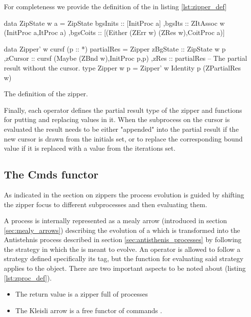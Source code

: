 For completeness we provide the definition of the  in
listing \ref{lst:zipper_def}

\begin{code}
\begin{haskellcode}
 data ZipState w a =
  ZipState
  { bgsInits :: [InitProc a]
   ,bgsIts :: ZItAssoc w (InitProc a,ItProc a)
   ,bgsCoits :: [(Either (ZErr w) (ZRes w),CoitProc a)]
  }

data Zipper' w cursf (p :: *) partialRes =
  Zipper
  { zBgState :: ZipState w p
   ,zCursor  :: cursf (Maybe (ZBnd w),InitProc p,p)
   ,zRes     :: partialRes -- The partial result without the cursor.
  }
type Zipper w p = Zipper' w Identity p (ZPartialRes w)
\end{haskellcode}
  \caption{\label{lst:zipper_def}The definition of the zipper.}
\end{code}

Finally, each operator defines the partial result type of the zipper
 and functions for putting and replacing values in
it. When the subprocess on the cursor is evaluated the result needs to
be either "appended" into the partial result if the new cursor is
drawn from the initials set, or to replace the corresponding bound
value if it is replaced with a value from the iterations set.

\subsection{The Cmds functor}
\label{sec:cmds_functor}

As indicated in the section on zippers the process evolution is guided
by shifting the zipper focus to different subprocesses and then
evaluating them.

A process is internally represented as a mealy arrow (introduced in
section \ref{sec:mealy_arrows}) describing the evolution of a
 which is transformed into the Antistehnis process
described in section \ref{sec:antisthenis_processes} by following the
strategy in which the  is meant to evolve. An operator is
allowed to follow a strategy defined specifically its
 tag, but the function for evaluating said strategy
applies to the  object. There are two important aspects to
be noted about  (listing \ref{lst:zproc_def}).

\begin{itemize}
\item The return value is a zipper full of processes 
\item The Kleisli arrow is a free functor of commands .
\end{itemize}

